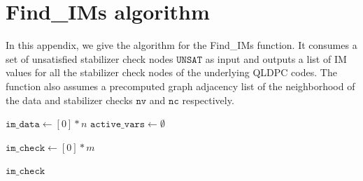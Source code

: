 \documentclass[%
 reprint,
 amsmath,amssymb,
 aps,
pra,
showkeys,
]{revtex4-2}
\begin{document}
\section{Find\_IMs algorithm}
\label{ap:findim}
In this appendix, we give the algorithm for the Find\_IMs function.
It consumes a set of unsatisfied stabilizer check nodes $\mathtt{UNSAT}$ as input and outputs a list of IM values for all the stabilizer check nodes of the underlying QLDPC codes.
The function also assumes a precomputed graph adjacency list of the neighborhood of the data and stabilizer checks $\mathtt{nv}$ and $\mathtt{nc}$ respectively.
\begin{algorithm}
\caption{Find\_IMs}\label{alg:find_im_opt}


$\mathtt{im\_data} \gets [0]*n$ 
$\mathtt{active\_vars} \gets \emptyset$

\BlankLine
{}

\BlankLine
{}
$\mathtt{im\_check} \gets [0] * m$ 


\BlankLine
\Return $\mathtt{im\_check}$

\end{algorithm}
\end{document}
